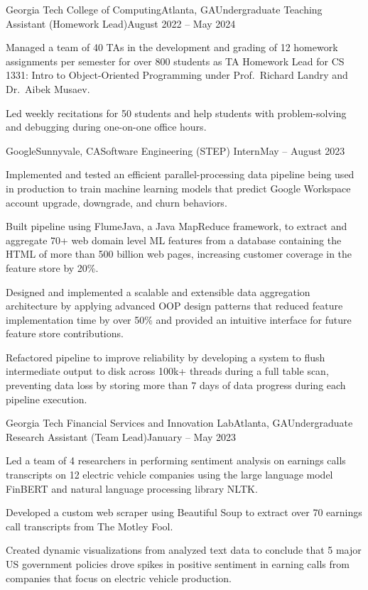\documentclass{article}
\begin{document}
\begin{flushleft}
    \begin{experience}{Georgia Tech College of Computing}{Atlanta, GA}{Undergraduate Teaching Assistant (Homework Lead)}{August 2022 -- May 2024}
        \item Managed a team of 40 TAs in the development and grading of 12 homework assignments per semester for over 800 students as TA Homework Lead for CS 1331: Intro to Object-Oriented Programming under Prof.~Richard Landry and Dr.~Aibek Musaev.
        \item Led weekly recitations for 50 students and help students with problem-solving and debugging during one-on-one office hours.
    \end{experience}

    \begin{experience}{Google}{Sunnyvale, CA}{Software Engineering (STEP) Intern}{May -- August 2023}
        \item Implemented and tested an efficient parallel-processing data pipeline being used in production to train machine learning models that predict Google Workspace account upgrade, downgrade, and churn behaviors.
        \item Built pipeline using FlumeJava, a Java MapReduce framework, to extract and aggregate 70+ web domain level ML features from a database containing the HTML of more than 500 billion web pages, increasing customer coverage in the feature store by 20\%.
        \item Designed and implemented a scalable and extensible data aggregation architecture by applying advanced OOP design patterns that reduced feature implementation time by over 50\% and provided an intuitive interface for future feature store contributions.
        \item Refactored pipeline to improve reliability by developing a system to flush intermediate output to disk across 100k+ threads during a full table scan, preventing data loss by storing more than 7 days of data progress during each pipeline execution.
    \end{experience}

    \begin{experience}{Georgia Tech Financial Services and Innovation Lab}{Atlanta, GA}{Undergraduate Research Assistant (Team Lead)}{January -- May 2023}
        \item Led a team of 4 researchers in performing sentiment analysis on earnings calls transcripts on 12 electric vehicle companies using the large language model FinBERT and natural language processing library NLTK.
        \item Developed a custom web scraper using Beautiful Soup to extract over 70 earnings call transcripts from The Motley Fool.
        \item Created dynamic visualizations from analyzed text data to conclude that 5 major US government policies drove spikes in positive sentiment in earning calls from companies that focus on electric vehicle production.
    \end{experience}



\end{flushleft}
\end{document}
